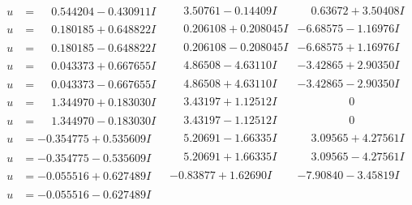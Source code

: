\documentclass[1p]{elsarticle_modified}
\theoremstyle{definition}
\begin{document}
$$\begin{array}{c|c|c}
 \hline 
\begin{aligned}
u &= \phantom{-}0.544204 - 0.430911 I\end{aligned}
 & \phantom{-}3.50761 - 0.14409 I & \phantom{-}0.63672 + 3.50408 I \\ \hline\begin{aligned}
u &= \phantom{-}0.180185 + 0.648822 I\end{aligned}
 & \phantom{-}0.206108 + 0.208045 I & -6.68575 - 1.16976 I \\ \hline\begin{aligned}
u &= \phantom{-}0.180185 - 0.648822 I\end{aligned}
 & \phantom{-}0.206108 - 0.208045 I & -6.68575 + 1.16976 I \\ \hline\begin{aligned}
u &= \phantom{-}0.043373 + 0.667655 I\end{aligned}
 & \phantom{-}4.86508 - 4.63110 I & -3.42865 + 2.90350 I \\ \hline\begin{aligned}
u &= \phantom{-}0.043373 - 0.667655 I\end{aligned}
 & \phantom{-}4.86508 + 4.63110 I & -3.42865 - 2.90350 I \\ \hline\begin{aligned}
u &= \phantom{-}1.344970 + 0.183030 I\end{aligned}
 & \phantom{-}3.43197 + 1.12512 I & \phantom{-0.000000 } 0 \\ \hline\begin{aligned}
u &= \phantom{-}1.344970 - 0.183030 I\end{aligned}
 & \phantom{-}3.43197 - 1.12512 I & \phantom{-0.000000 } 0 \\ \hline\begin{aligned}
u &= -0.354775 + 0.535609 I\end{aligned}
 & \phantom{-}5.20691 - 1.66335 I & \phantom{-}3.09565 + 4.27561 I \\ \hline\begin{aligned}
u &= -0.354775 - 0.535609 I\end{aligned}
 & \phantom{-}5.20691 + 1.66335 I & \phantom{-}3.09565 - 4.27561 I \\ \hline\begin{aligned}
u &= -0.055516 + 0.627489 I\end{aligned}
 & -0.83877 + 1.62690 I & -7.90840 - 3.45819 I \\ \hline\begin{aligned}
u &= -0.055516 - 0.627489 I\end{aligned}

\end{array}$$
\end{document}

